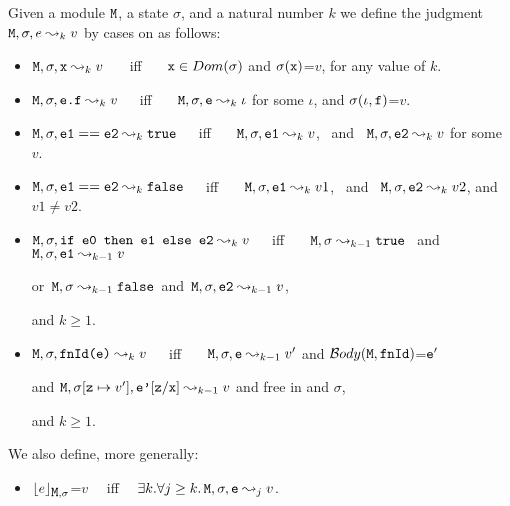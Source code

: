 \documentclass[acmsmall,screen]{acmart}
\begin{document}
\begin{definition}
\label{def:expr:step:index}
Given a module ${\mbox{\tt{M}}}$, a state $\sigma$, and a natural number $k$ we define the judgment ${\mbox{\tt{M}}}, \sigma, e \leadsto_k v$ by cases on  as follows:
\begin{itemize}
\item
${\mbox{\tt{M}}}, \sigma, {\mbox{\tt{x}}} \leadsto_k v$ \ \ \  iff \ \ \  ${\mbox{\tt{x}}}\in Dom(\sigma)$  and $\sigma({\mbox{\tt{x}}})$=$v$, for any value of $k$.
\item
${\mbox{\tt{M}}}, \sigma, {\mbox{\tt{e.f}}} \leadsto_k v$\ \ \  iff \ \ \  ${\mbox{\tt{M}}}, \sigma, {\mbox{\tt{e}}} \leadsto_{k} \iota$ for some $\iota$,  %
and $\sigma(\iota,{\mbox{\tt{f}}})$=$v$.
\item
${\mbox{\tt{M}}}, \sigma, {\mbox{\tt{e1}}}=={\mbox{\tt{e2}}} \leadsto_k {\mbox{\tt{true}}}$\ \ \  iff \ \ \  ${\mbox{\tt{M}}}, \sigma, {\mbox{\tt{e1}}} \leadsto_{k} v$, \ and \ ${\mbox{\tt{M}}}, \sigma, {\mbox{\tt{e2}}} \leadsto_{k} v$ for some $v$.
\item
${\mbox{\tt{M}}}, \sigma, {\mbox{\tt{e1}}}=={\mbox{\tt{e2}}} \leadsto_k {\mbox{\tt{false}}}$\ \ \  iff \ \ \  ${\mbox{\tt{M}}}, \sigma, {\mbox{\tt{e1}}} \leadsto_{k} v1$, \ and \ ${\mbox{\tt{M}}}, \sigma, {\mbox{\tt{e2}}} \leadsto_{k} v2$, and $v1\neq v2$. %
\item
${\mbox{\tt{M}}}, \sigma, {\mbox{\tt{if\ e0 then\ e1\ else e2}}} \leadsto_k v$\ \ \  iff \ \ \    ${\mbox{\tt{M}}}, \sigma \leadsto_{k-1} {\mbox{\tt{true}}} $ \ and\ ${\mbox{\tt{M}}}, \sigma, {\mbox{\tt{e1}}} \leadsto_{k-1} v$ \\
\strut \hspace{2.6in} or\ ${\mbox{\tt{M}}}, \sigma \leadsto_{k-1} {\mbox{\tt{false}}} $\  and\ ${\mbox{\tt{M}}}, \sigma, {\mbox{\tt{e2}}} \leadsto_{k-1} v$,\\
\strut \hspace{2.6in}  and  $k\geq 1$.
\item
${\mbox{\tt{M}}}, \sigma, {\mbox{\tt{fnId(e)}}} \leadsto_k v$\ \ \  iff \ \ \    ${\mbox{\tt{M}}}, \sigma, {\mbox{\tt{e}}} \leadsto_{k-1} v'$  and $\mathcal{B}ody({\mbox{\tt{M}}},{\mbox{\tt{{\mbox{\tt{fnId}}}}}})$=${\mbox{\tt{e}}}'$ \\
 \strut \hspace{1.55in} and  ${\mbox{\tt{M}}}, \sigma[{\mbox{\tt{z}}}\mapsto v'], {\mbox{\tt{e'}}}[{\mbox{\tt{z}}}/{\mbox{\tt{x}}}]  \leadsto_{k-1} v $ and    free in  and  $\sigma$,\\
 \strut \hspace{1.55in} and $k\geq 1$.
\end{itemize}

 We also define, more generally:
\begin{itemize}
\item
${\lfloor{ {e}}\rfloor_{{\mbox{\tt{M}}},\sigma}}$=$v$ \ \  iff \ \  $\exists k.\forall j\geq k. \,  {\mbox{\tt{M}}}, \sigma, {\mbox{\tt{e}}} \leadsto_j v$.
\end{itemize}
\end{definition}
\end{document}
